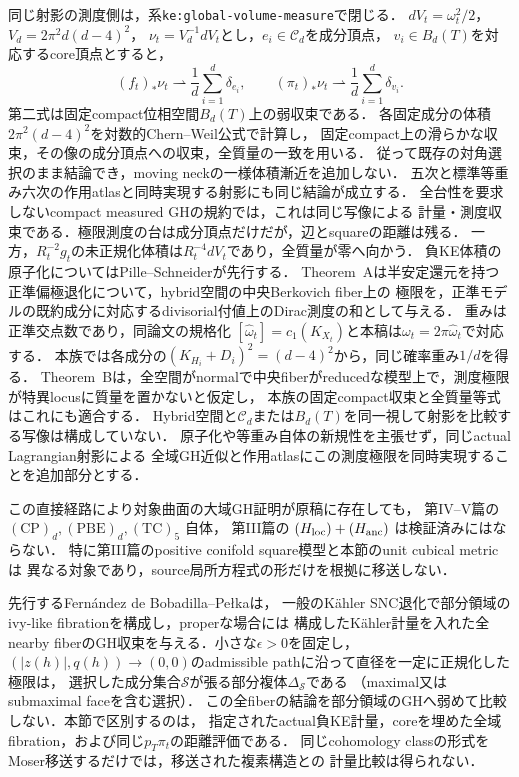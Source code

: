 \documentclass[a4paper,11pt]{ltjsarticle}
\numberwithin{equation}{section}
\theoremstyle{plain}
\theoremstyle{definition}
\theoremstyle{remark}
\newcommand{\cC}{\mathcal C}
\newcommand{\Rt}{R_t}
\begin{document}
同じ射影の測度側は，系\texttt{ke:global-volume-measure}で閉じる．
\(dV_t=\omega_t^2/2\)，\(V_d=2\pi^2d(d-4)^2\)，
\(\nu_t=V_d^{-1}dV_t\)とし，\(e_i\in\cC_d\)を成分頂点，
\(v_i\in B_d(T)\)を対応するcore頂点とすると，
\begin{equation}
 (f_t)_*\nu_t\rightharpoonup\frac1d\sum_{i=1}^d\delta_{e_i},
 \qquad
 (\pi_t)_*\nu_t\rightharpoonup\frac1d\sum_{i=1}^d\delta_{v_i}.
\label{eq:same-map-probability-volume}
\end{equation}
第二式は固定compact位相空間\(B_d(T)\)上の弱収束である．
各固定成分の体積\(2\pi^2(d-4)^2\)を対数的Chern--Weil公式で計算し，
固定compact上の滑らかな収束，その像の成分頂点への収束，全質量の一致を用いる．
従って既存の対角選択のまま結論でき，moving neckの一様体積漸近を追加しない．
五次と標準等重み六次の作用atlasと同時実現する射影にも同じ結論が成立する．
全台性を要求しないcompact measured GHの規約では，これは同じ写像による
計量・測度収束である．極限測度の台は成分頂点だけだが，辺とsquareの距離は残る．
一方，\(\Rt^{-2}g_t\)の未正規化体積は\(\Rt^{-4}dV_t\)であり，全質量が零へ向かう．
負KE体積の原子化についてはPille--Schneider\cite[Theorems~A--B, pp.~589--590]{PilleSchneiderHybrid}が先行する．
Theorem~Aは半安定還元を持つ正準偏極退化について，hybrid空間の中央Berkovich fiber上の
極限を，正準モデルの既約成分に対応するdivisorial付値上のDirac測度の和として与える．
重みは正準交点数であり，同論文の規格化
$[\widehat\omega_t]=c_1(K_{X_t})$と本稿は$\omega_t=2\pi\widehat\omega_t$で対応する．
本族では各成分の$(K_{H_i}+D_i)^2=(d-4)^2$から，同じ確率重み$1/d$を得る．
Theorem~Bは，全空間がnormalで中央fiberがreducedな模型上で，測度極限が特異locusに質量を置かないと仮定し，
本族の固定compact収束と全質量等式はこれにも適合する．
Hybrid空間と$\cC_d$または$B_d(T)$を同一視して射影を比較する写像は構成していない．
原子化や等重み自体の新規性を主張せず，同じactual Lagrangian射影による
全域GH近似と作用atlasにこの測度極限を同時実現することを追加部分とする．

この直接経路により対象曲面の大域GH証明が原稿に存在しても，
第IV--V篇の \(\mathrm{(CP)}_d,\mathrm{(PBE)}_d,\mathrm{(TC)}_5\) 自体，
第III篇の \((H_{\rm loc})+(H_{\rm anc})\) は検証済みにはならない．
特に第III篇のpositive conifold square模型と本節のunit cubical metricは
異なる対象であり，source局所方程式の形だけを根拠に移送しない．

先行するFernández de Bobadilla--Pełka\cite[Theorem~6.14(b),(c)]{FBP}は，
一般のKähler SNC退化で部分領域のivy-like fibrationを構成し，properな場合には
構成したKähler計量を入れた全nearby fiberのGH収束を与える．小さな\(\epsilon>0\)を固定し，
\((|z(h)|,q(h))\to(0,0)\)のadmissible pathに沿って直径を一定に正規化した極限は，
選択した成分集合\(\mathcal S\)が張る部分複体\(\Delta_{\mathcal S}\)である
（maximal又はsubmaximal faceを含む選択）．
この全fiberの結論を部分領域のGHへ弱めて比較しない．本節で区別するのは，
指定されたactual負KE計量，coreを埋めた全域fibration，および同じ\(p_T\pi_t\)の距離評価である．
同じcohomology classの形式をMoser移送するだけでは，移送された複素構造との
計量比較は得られない．
\end{document}
